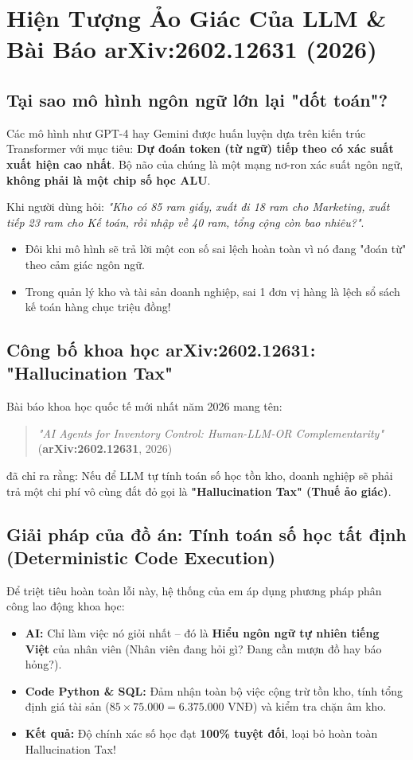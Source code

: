 \documentclass[11pt,a4paper]{article}
\begin{document}
\section{Hiện Tượng Ảo Giác Của LLM \& Bài Báo arXiv:2602.12631 (2026)}

\subsection{Tại sao mô hình ngôn ngữ lớn lại "dốt toán"?}
Các mô hình như GPT-4 hay Gemini được huấn luyện dựa trên kiến trúc Transformer với mục tiêu: \textbf{Dự đoán token (từ ngữ) tiếp theo có xác suất xuất hiện cao nhất}. Bộ não của chúng là một mạng nơ-ron xác suất ngôn ngữ, \textbf{không phải là một chip số học ALU}.

Khi người dùng hỏi: \textit{"Kho có 85 ram giấy, xuất đi 18 ram cho Marketing, xuất tiếp 23 ram cho Kế toán, rồi nhập về 40 ram, tổng cộng còn bao nhiêu?"}.
\begin{itemize}
    \item Đôi khi mô hình sẽ trả lời một con số sai lệch hoàn toàn vì nó đang "đoán từ" theo cảm giác ngôn ngữ.
    \item Trong quản lý kho và tài sản doanh nghiệp, sai 1 đơn vị hàng là lệch sổ sách kế toán hàng chục triệu đồng!
\end{itemize}

\subsection{Công bố khoa học arXiv:2602.12631: "Hallucination Tax"}
Bài báo khoa học quốc tế mới nhất năm 2026 mang tên:
\begin{quote}
\textit{"AI Agents for Inventory Control: Human-LLM-OR Complementarity"} (\textbf{arXiv:2602.12631}, 2026)
\end{quote}
đã chỉ ra rằng: Nếu để LLM tự tính toán số học tồn kho, doanh nghiệp sẽ phải trả một chi phí vô cùng đắt đỏ gọi là \textbf{"Hallucination Tax" (Thuế ảo giác)}.

\subsection{Giải pháp của đồ án: Tính toán số học tất định (Deterministic Code Execution)}
Để triệt tiêu hoàn toàn lỗi này, hệ thống của em áp dụng phương pháp phân công lao động khoa học:
\begin{itemize}
    \item \textbf{AI:} Chỉ làm việc nó giỏi nhất -- đó là \textbf{Hiểu ngôn ngữ tự nhiên tiếng Việt} của nhân viên (Nhân viên đang hỏi gì? Đang cần mượn đồ hay báo hỏng?).
    \item \textbf{Code Python \& SQL:} Đảm nhận toàn bộ việc cộng trừ tồn kho, tính tổng định giá tài sản ($85 \times 75.000 = 6.375.000$ VNĐ) và kiểm tra chặn âm kho.
    \item \textbf{Kết quả:} Độ chính xác số học đạt \textbf{100\% tuyệt đối}, loại bỏ hoàn toàn Hallucination Tax!
\end{itemize}
\end{document}
